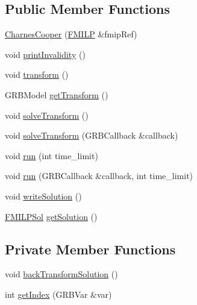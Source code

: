 \subsection*{Public Member Functions}
\begin{DoxyCompactItemize}
\item 
\hyperlink{classgrbfrc_1_1CharnesCooper_ae4d0123b4534f7447ddd27ad5273e94b}{Charnes\+Cooper} (\hyperlink{classgrbfrc_1_1FMILP}{F\+M\+I\+LP} \&fmip\+Ref)
\item 
void \hyperlink{classgrbfrc_1_1CharnesCooper_a7fd7dab1c9c2b07684f632ec760ce254}{print\+Invalidity} ()
\item 
void \hyperlink{classgrbfrc_1_1CharnesCooper_a39fc997916d1ea49eb71befd41b00122}{transform} ()
\item 
G\+R\+B\+Model \hyperlink{classgrbfrc_1_1CharnesCooper_aaa36ff99822f4a8e04c01ccc6125230c}{get\+Transform} ()
\item 
void \hyperlink{classgrbfrc_1_1CharnesCooper_a79b2646f00c0af4273b966986710626b}{solve\+Transform} ()
\item 
void \hyperlink{classgrbfrc_1_1CharnesCooper_ae2f31c9cf6147ad76c613b2073ff7507}{solve\+Transform} (G\+R\+B\+Callback \&callback)
\item 
void \hyperlink{classgrbfrc_1_1CharnesCooper_a997fa3c5b32d054ae738b25963475385}{run} (int time\+\_\+limit)
\item 
void \hyperlink{classgrbfrc_1_1CharnesCooper_a9510b70409c15dab111b86ffd4c86c95}{run} (G\+R\+B\+Callback \&callback, int time\+\_\+limit)
\item 
void \hyperlink{classgrbfrc_1_1CharnesCooper_af049a6093903e579e88c5d18c946cb03}{write\+Solution} ()
\item 
\hyperlink{structgrbfrc_1_1FMILPSol}{F\+M\+I\+L\+P\+Sol} \hyperlink{classgrbfrc_1_1CharnesCooper_aa202a1ad545d3e99fe29331360fd4456}{get\+Solution} ()
\end{DoxyCompactItemize}
\subsection*{Private Member Functions}
\begin{DoxyCompactItemize}
\item 
void \hyperlink{classgrbfrc_1_1CharnesCooper_a68d987a454bdb20c7ef9a3d51f4cc85a}{back\+Transform\+Solution} ()
\item 
int \hyperlink{classgrbfrc_1_1CharnesCooper_a48c5969100c05b92d2f60e8f48925b0d}{get\+Index} (G\+R\+B\+Var \&var)
\end{DoxyCompactItemize}
